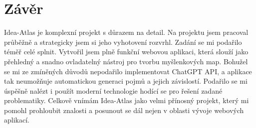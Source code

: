 \section{Závěr}
Idea-Atlas je komplexní projekt s důrazem na detail. Na projektu jsem pracoval průběžně a strategicky jsem si jeho vyhotovení rozvrhl.
\newline
Zadání se mi podařilo téměř celé splnit. Vytvořil jsem plně funkční webovou aplikaci, která slouží jako přehledný a snadno ovladatelný nástroj pro tvorbu myšlenkových map. Bohužel se mi ze zmíněných důvodů nepodařilo implementovat ChatGPT API, a aplikace tak neumožňuje automatickou generaci pojmů a jejich závislostí. Podařilo se mi úspěšně nalézt i použít moderní technologie hodící se pro řešení zadané problematiky. Celkově vnímám Idea-Atlas jako velmi přínosný projekt, který mi pomohl prohloubit znalosti a posunout se dál nejen v oblasti vývoje webových aplikací.